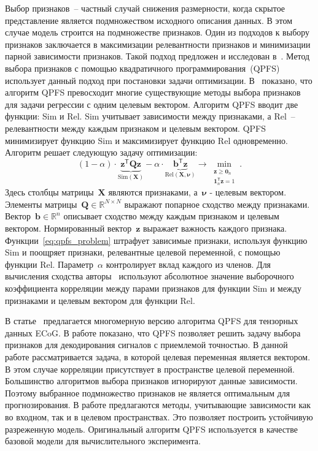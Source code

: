 \documentclass[preprint,12pt]{elsarticle}
\theoremstyle{definition}
\newcommand{\bz}{\mathbf{z}}
\newcommand{\bb}{\mathbf{b}}
\newcommand{\bX}{\mathbf{X}}
\newcommand{\bQ}{\mathbf{Q}}
\newcommand{\bbR}{\mathbb{R}}
\newcommand{\T}{\mathsf{T}}
\newcommand{\bnu}{\boldsymbol{\nu}}
\newcommand{\bOne}{\boldsymbol{1}}
\newcommand{\bZero}{\boldsymbol{0}}
\begin{document}
Выбор признаков~-- частный случай снижения размерности, когда скрытое представление является подмножеством исходного описания данных. 
В этом случае модель строится на подмножестве признаков. 
Один из подходов к выбору признаков заключается в максимизации релевантности признаков и минимизации парной зависимости признаков. 
Такой подход предложен и исследован в~\cite{ding2005minimum, yamada2014high}.
Метод выбора признаков с помощью квадратичного программирования~(QPFS)~\cite{rodriguez2010quadratic} использует данный подход при постановки задачи оптимизации. В~\cite{katrutsa2017comprehensive} показано, что алгоритм QPFS превосходит многие существующие методы выбора признаков для задачи регрессии с одним целевым вектором. 
Алгоритм QPFS вводит две функции: Sim и Rel.
Sim учитывает зависимости между признаками, а Rel~--релевантности между каждым признаком и целевым вектором.
QPFS минимизирует функцию Sim и максимизирует функцию Rel одновременно.
Алгоритм решает следующую задачу оптимизации:
\begin{equation}
(1 - \alpha) \cdot \underbrace{\bz^{\T} \bQ \bz}_{\text{Sim}(\bX)} - \alpha \cdot \underbrace{ \bb^{\T} \bz}_{\text{Rel} (\bX, \bnu)} \rightarrow \min_{\substack{\bz \geq \bZero_n \\ \bOne_n^{\T} \bz=1}}.
\label{eq:qpfs_problem}
\end{equation}
Здесь столбцы матрицы~$\bX$ являются признаками, а~$\bnu$ - целевым вектором. 
Элементы матрицы~$\bQ \in \bbR^{N \times N}$ выражают попарное сходство между признаками.
Вектор~$\bb \in \bbR^n$ описывает сходство между каждым признаком и целевым вектором.
Нормированный вектор~$\bz$ выражает важность каждого признака.
Функции~\eqref{eq:qpfs_problem} штрафует зависимые признаки, используя функцию Sim и поощряет признаки, релевантные целевой переменной, с помощью функции Rel.
Параметр~$\alpha$ контролирует вклад каждого из членов.
Для вычисления сходства авторы~\cite{rodriguez2010quadratic} используют абсолютное значение выборочного коэффициента корреляции между парами признаков для функции Sim и между признаками и целевым вектором для функции Rel.

В статье~\cite{motrenko2018multi} предлагается многомерную версию алгоритма QPFS для тензорных данных ECoG. 
В работе показано, что QPFS позволяет решить задачу выбора признаков для декодирования сигналов с приемлемой точностью.
В данной работе рассматривается задача, в которой целевая переменная является вектором. 
В этом случае корреляции присутствует в пространстве целевой переменной. 
Большинство алгоритмов выбора признаков игнорируют данные зависимости.
Поэтому выбранное подмножество признаков не является оптимальным для прогнозирования.
В работе предлагаются методы, учитывающие зависимости как во входном, так и в целевом пространствах. 
Это позволяет построить устойчивую разреженную модель.
Оригинальный алгоритм QPFS используется в качестве базовой модели для вычислительного эксперимента.
\end{document}
